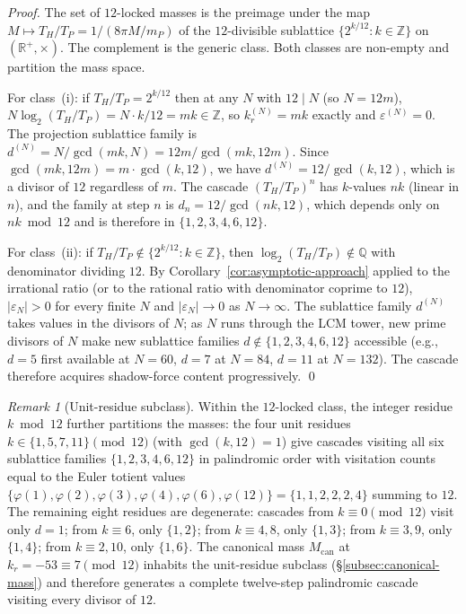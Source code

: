 \documentclass[11pt,a4paper]{article}
\theoremstyle{definition}
\theoremstyle{remark}
\newtheorem{remark}[theorem]{Remark}
\begin{document}
\begin{proof}
The set of $12$-locked masses is the preimage under the map $M \mapsto T_{H}/T_{P} = 1/(8\pi M/m_{P})$ of the $12$-divisible sublattice $\{2^{k/12} : k \in \mathbb{Z}\}$ on $(\mathbb{R}^{+},\times)$. The complement is the generic class. Both classes are non-empty and partition the mass space.

For class~(i): if $T_{H}/T_{P} = 2^{k/12}$ then at any $N$ with $12 \mid N$ (so $N = 12m$), $N\log_{2}(T_{H}/T_{P}) = N \cdot k/12 = mk \in \mathbb{Z}$, so $k_{r}^{(N)} = mk$ exactly and $\varepsilon^{(N)} = 0$. The projection sublattice family is $d^{(N)} = N/\gcd(mk, N) = 12m/\gcd(mk,12m)$. Since $\gcd(mk,12m) = m\cdot\gcd(k,12)$, we have $d^{(N)} = 12/\gcd(k,12)$, which is a divisor of $12$ regardless of $m$. The cascade $(T_{H}/T_{P})^{n}$ has $k$-values $nk$ (linear in $n$), and the family at step $n$ is $d_{n} = 12/\gcd(nk,12)$, which depends only on $n k \bmod 12$ and is therefore in $\{1,2,3,4,6,12\}$.

For class~(ii): if $T_{H}/T_{P} \notin \{2^{k/12} : k \in \mathbb{Z}\}$, then $\log_{2}(T_{H}/T_{P}) \notin \mathbb{Q}$ with denominator dividing $12$. By Corollary~\ref{cor:asymptotic-approach} applied to the irrational ratio (or to the rational ratio with denominator coprime to $12$), $|\varepsilon_{N}| > 0$ for every finite $N$ and $|\varepsilon_{N}| \to 0$ as $N \to \infty$. The sublattice family $d^{(N)}$ takes values in the divisors of $N$; as $N$ runs through the LCM tower, new prime divisors of $N$ make new sublattice families $d \notin \{1,2,3,4,6,12\}$ accessible (e.g., $d=5$ first available at $N=60$, $d=7$ at $N=84$, $d=11$ at $N=132$). The cascade therefore acquires shadow-force content progressively. \qed
\end{proof}

\begin{remark}[Unit-residue subclass]\label{rem:unit-residue-subclass}
Within the $12$-locked class, the integer residue $k \bmod 12$ further partitions the masses: the four unit residues $k \in \{1,5,7,11\} \pmod{12}$ (with $\gcd(k,12)=1$) give cascades visiting all six sublattice families $\{1,2,3,4,6,12\}$ in palindromic order with visitation counts equal to the Euler totient values $\{\varphi(1),\varphi(2),\varphi(3),\varphi(4),\varphi(6),\varphi(12)\} = \{1,1,2,2,2,4\}$ summing to $12$. The remaining eight residues are degenerate: cascades from $k \equiv 0 \pmod{12}$ visit only $d=1$; from $k \equiv 6$, only $\{1,2\}$; from $k \equiv 4,8$, only $\{1,3\}$; from $k \equiv 3,9$, only $\{1,4\}$; from $k \equiv 2,10$, only $\{1,6\}$. The canonical mass $M_{\text{can}}$ at $k_{r} = -53 \equiv 7 \pmod{12}$ inhabits the unit-residue subclass (\S\ref{subsec:canonical-mass}) and therefore generates a complete twelve-step palindromic cascade visiting every divisor of $12$.
\end{remark}
\end{document}

